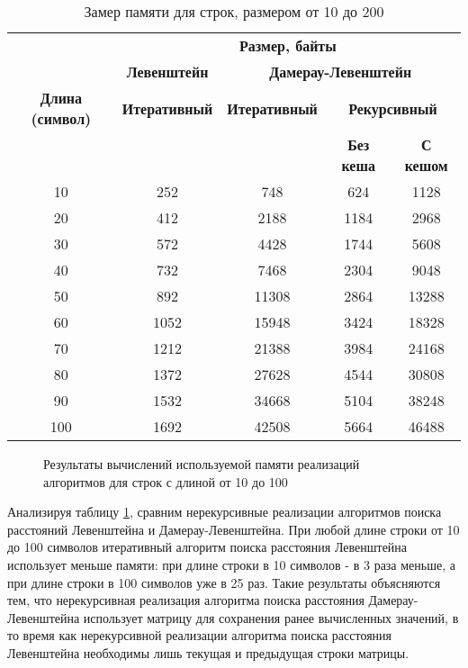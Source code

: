 \begin{table}[ht]
	\small
	\begin{center}
		\begin{threeparttable}
			\caption{Замер памяти для строк, размером от 10 до 200}
			\label{tbl:memory}
			\begin{tabular}{|c|c|c|c|c|}
				\hline
				& \multicolumn{4}{c|}{\bfseries Размер, байты} \\ \cline{2-5}
				& \multicolumn{1}{c|}{\bfseries Левенштейн}
				& \multicolumn{3}{c|}{\bfseries Дамерау-Левенштейн} \\ \cline{2-5}
				\bfseries Длина (символ) & \bfseries Итеративный & \bfseries Итеративный & \multicolumn{2}{c|}{\bfseries Рекурсивный} \\ \cline{4-5}
				& & & \bfseries Без кеша & \bfseries С кешом \\
				\hline
				10 & 252 & 748 & 624 & 1128 \\
				\hline
				20 & 412 & 2188 & 1184 & 2968 \\
				\hline
				30 & 572 & 4428 & 1744 & 5608 \\
				\hline
				40 & 732 & 7468 & 2304 & 9048 \\
				\hline
				50 & 892 & 11308 & 2864 & 13288 \\
				\hline
				60 &  1052 & 15948 & 3424 & 18328 \\
				\hline
				70 & 1212 & 21388 & 3984 & 24168 \\
				\hline
				80 &1372 & 27628 & 4544 & 30808 \\
				\hline
				90 & 1532 & 34668 & 5104 &  38248 \\
				\hline
				100 & 1692 & 42508 & 5664 & 46488 \\
				\hline
			\end{tabular}	
		\end{threeparttable}
	\end{center}
\end{table}

\begin{figure}[h]
	\centering
	
	\caption{Результаты вычислений используемой памяти реализаций алгоритмов для строк с длиной от 10 до 100}
	\label{img:linear_graph_mem}
\end{figure}


\clearpage

Анализируя таблицу \ref{tbl:memory}, сравним нерекурсивные реализации алгоритмов поиска расстояний Левенштейна и Дамерау-Левенштейна. При любой длине строки от 10 до 100 символов итеративный алгоритм поиска расстояния Левенштейна использует меньше памяти: при длине строки в 10 символов - в 3 раза меньше, а при длине строки в 100 символов уже в 25 раз. Такие результаты объясняются тем, что нерекурсивная реализация алгоритма поиска расстояния Дамерау-Левенштейна использует матрицу для сохранения ранее вычисленных значений, в то время как нерекурсивной реализации алгоритма поиска расстояния Левенштейна необходимы лишь текущая и предыдущая строки матрицы.

